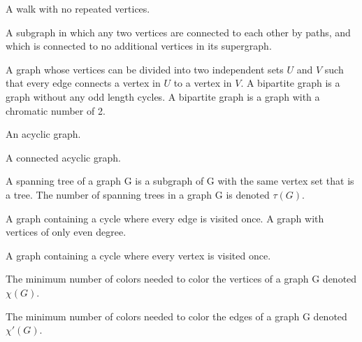 \begin{definition}[Path]
    A walk with no repeated vertices.
\end{definition} 

\begin{definition}[Component]
    A subgraph in which any two vertices are connected to each other by paths, and which is connected to no additional vertices in its supergraph.
\end{definition} 


\begin{definition}
    A graph whose vertices can be divided into two independent sets $U$ and $V$ such that every edge connects a vertex in $U$ to a vertex in $V$. A bipartite graph is a graph without any odd length cycles. A bipartite graph is a graph with a chromatic number of 2.
\end{definition} 

\begin{definition}[Forest]
    An acyclic graph.
\end{definition} 

\begin{definition}[Tree]
    A connected acyclic graph.
\end{definition} 

\begin{definition}
    A spanning tree of a graph G is a subgraph of G with the same vertex set that is a tree. The number of spanning trees in a graph G is denoted $\tau(G)$.
\end{definition} 

\begin{definition}
    A graph containing a cycle where every edge is visited once. A graph with vertices of only even degree.
\end{definition} 

\begin{definition}
    A graph containing a cycle where every vertex is visited once.
\end{definition} 



\begin{definition}
    The minimum number of colors needed to color the vertices of a graph G denoted $\chi(G)$.
\end{definition} 

\begin{definition}
    The minimum number of colors needed to color the edges of a graph G denoted $\chi'(G)$.
\end{definition} 

